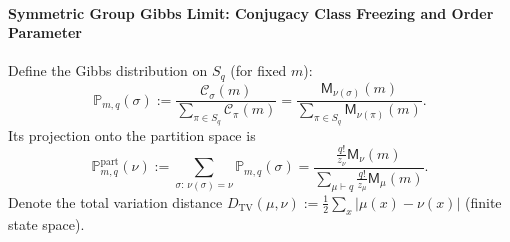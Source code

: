 \paragraph{Symmetric Group Gibbs Limit: Conjugacy Class Freezing and Order Parameter}
Define the Gibbs distribution on \(S_q\) (for fixed \(m\)):
\[
\mathbb P_{m,q}(\sigma):=\frac{\mathcal{C}_\sigma(m)}{\sum_{\pi\in S_q}\mathcal{C}_\pi(m)}
=\frac{\mathsf{M}_{\nu(\sigma)}(m)}{\sum_{\pi\in S_q}\mathsf{M}_{\nu(\pi)}(m)}.
\]
Its projection onto the partition space is
\[
\mathbb P^{\mathrm{part}}_{m,q}(\nu)
:=
\sum_{\sigma:\,\nu(\sigma)=\nu}\mathbb P_{m,q}(\sigma)
=
\frac{\frac{q!}{z_\nu}\mathsf{M}_\nu(m)}{\sum_{\mu\vdash q}\frac{q!}{z_\mu}\mathsf{M}_\mu(m)}.
\]
Denote the total variation distance \(D_{\mathrm{TV}}(\mu,\nu):=\frac12\sum_x|\mu(x)-\nu(x)|\) (finite state space).

